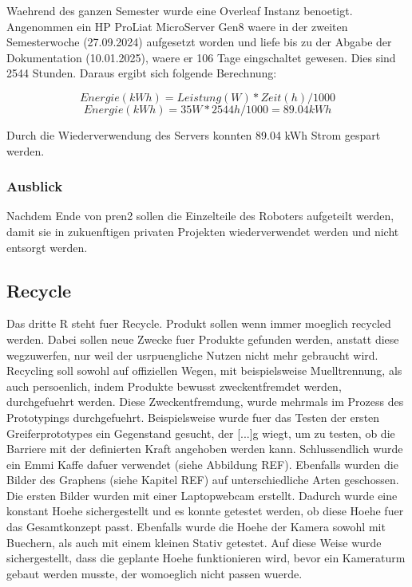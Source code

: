 Waehrend des ganzen Semester wurde eine Overleaf Instanz benoetigt. Angenommen ein HP ProLiat MicroServer Gen8 waere in der zweiten Semesterwoche (27.09.2024) aufgesetzt worden und liefe bis zu der Abgabe der Dokumentation (10.01.2025), waere er 106 Tage eingschaltet gewesen.
Dies sind 2544 Stunden. Daraus ergibt sich folgende Berechnung:

\[Energie(kWh)=Leistung(W) * Zeit(h) / 1000\]
\[Energie(kWh)=35W * 2544h / 1000 = 89.04kWh\]

 Durch die Wiederverwendung des Servers konnten 89.04 kWh Strom gespart werden.

 
\subsubsection{Ausblick}

Nachdem Ende von \acrshort{pren2} sollen die Einzelteile des Roboters aufgeteilt werden, damit sie in zukuenftigen privaten Projekten wiederverwendet werden und nicht entsorgt werden.



\subsection{Recycle}

Das dritte R steht fuer Recycle. Produkt sollen wenn immer moeglich recycled werden. Dabei sollen neue Zwecke fuer Produkte gefunden werden, anstatt diese wegzuwerfen, nur weil der usrpuengliche Nutzen nicht mehr gebraucht wird. Recycling soll sowohl auf offiziellen Wegen, mit beispielsweise Muelltrennung, als auch persoenlich, indem Produkte bewusst zweckentfremdet werden, durchgefuehrt werden. Diese Zweckentfremdung, wurde mehrmals im Prozess des Prototypings durchgefuehrt. Beispielsweise wurde fuer das Testen der ersten Greiferprototypes ein Gegenstand gesucht, der [...]g wiegt, um zu testen, ob die Barriere mit der definierten Kraft angehoben werden kann. Schlussendlich wurde ein Emmi Kaffe dafuer verwendet (siehe Abbildung REF). Ebenfalls wurden die Bilder des Graphens (siehe Kapitel REF) auf unterschiedliche Arten geschossen. Die ersten Bilder wurden mit einer Laptopwebcam erstellt. Dadurch wurde eine konstant Hoehe sichergestellt und es konnte getestet werden, ob diese Hoehe fuer das Gesamtkonzept passt. Ebenfalls wurde die Hoehe der Kamera sowohl mit Buechern, als auch mit einem kleinen Stativ getestet. Auf diese Weise wurde sichergestellt, dass die geplante Hoehe funktionieren wird, bevor ein Kameraturm gebaut werden musste, der womoeglich nicht passen wuerde.


